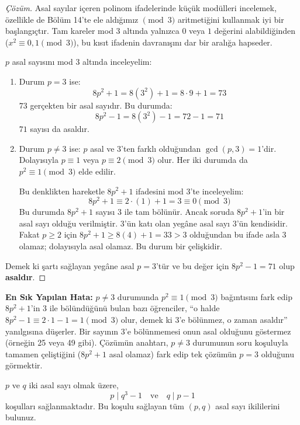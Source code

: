 \begin{proof}[Çözüm]
Asal sayılar içeren polinom ifadelerinde küçük modülleri incelemek, özellikle de Bölüm 14'te ele aldığımız $\pmod 3$ aritmetiğini kullanmak iyi bir başlangıçtır. Tam kareler mod 3 altında yalnızca $0$ veya $1$ değerini alabildiğinden ($x^2 \equiv 0, 1 \pmod 3$), bu kısıt ifadenin davranışını dar bir aralığa hapseder.

$p$ asal sayısını mod 3 altında inceleyelim:
\begin{enumerate}
    \item Durum $p = 3$ ise:
    \[
    8p^2 + 1 = 8(3^2) + 1 = 8 \cdot 9 + 1 = 73
    \]
    $73$ gerçekten bir asal sayıdır. Bu durumda:
    \[
    8p^2 - 1 = 8(3^2) - 1 = 72 - 1 = 71
    \]
    $71$ sayısı da asaldır.
    
    \item Durum $p \neq 3$ ise:
    $p$ asal ve $3$'ten farklı olduğundan $\gcd(p, 3) = 1$'dir. Dolayısıyla $p \equiv 1$ veya $p \equiv 2 \pmod 3$ olur. Her iki durumda da $p^2 \equiv 1 \pmod 3$ elde edilir.
    
    Bu denklikten hareketle $8p^2 + 1$ ifadesini mod 3'te inceleyelim:
    \[
    8p^2 + 1 \equiv 2 \cdot (1) + 1 = 3 \equiv 0 \pmod 3
    \]
    Bu durumda $8p^2 + 1$ sayısı 3 ile tam bölünür. Ancak soruda $8p^2 + 1$'in bir asal sayı olduğu verilmiştir. 3'ün katı olan yegâne asal sayı $3$'ün kendisidir. Fakat $p \ge 2$ için $8p^2 + 1 \ge 8(4) + 1 = 33 > 3$ olduğundan bu ifade asla 3 olamaz; dolayısıyla asal olamaz. Bu durum bir çelişkidir.
\end{enumerate}
Demek ki şartı sağlayan yegâne asal $p = 3$'tür ve bu değer için $8p^2 - 1 = 71$ olup \textbf{asaldır}.
\end{proof}

\textbf{En Sık Yapılan Hata:} $p \neq 3$ durumunda $p^2 \equiv 1 \pmod 3$ bağıntısını fark edip $8p^2 + 1$'in 3 ile bölündüğünü bulan bazı öğrenciler, ``o halde $8p^2 - 1 \equiv 2 \cdot 1 - 1 = 1 \pmod 3$ olur, demek ki 3'e bölünmez, o zaman asaldır'' yanılgısına düşerler. Bir sayının 3'e bölünmemesi onun asal olduğunu göstermez (örneğin 25 veya 49 gibi). Çözümün anahtarı, $p \neq 3$ durumunun soru koşuluyla tamamen çeliştiğini ($8p^2+1$ asal olamaz) fark edip tek çözümün $p=3$ olduğunu görmektir.

\begin{example}
$p$ ve $q$ iki asal sayı olmak üzere,
\[
p \mid q^3 - 1 \quad \text{ve} \quad q \mid p - 1
\]
koşulları sağlanmaktadır. Bu koşulu sağlayan tüm $(p, q)$ asal sayı ikililerini bulunuz.
\end{example}

